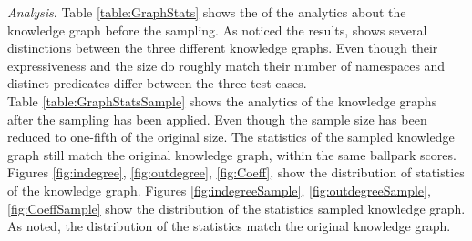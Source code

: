 \documentclass{article}
\begin{document}
\textit{Analysis}. Table \ref{table:GraphStats} shows the of the analytics about the knowledge graph before the sampling. As noticed the results, shows several distinctions between the three different knowledge graphs. Even though their expressiveness and the size do roughly match their number of namespaces and distinct predicates 
differ between the three test cases.\\
Table \ref{table:GraphStatsSample} shows the analytics of the knowledge graphs after the sampling has been applied. Even though the sample size has been reduced to one-fifth of the original size. The statistics of the sampled knowledge graph still match the original knowledge graph, within the same ballpark scores.
Figures \ref{fig:indegree},  \ref{fig:outdegree},  \ref{fig:Coeff}, show the distribution of statistics of the knowledge graph. %
Figures \ref{fig:indegreeSample},  \ref{fig:outdegreeSample},  \ref{fig:CoeffSample} show the distribution of the statistics sampled knowledge graph. As noted, the distribution of the statistics match the original knowledge graph. \\

\begin{table}[!t]
	\centering
	\caption{table showing several statistics about graphs.}
	\label{table:GraphStatsSample}
\end{table}
\end{document}
